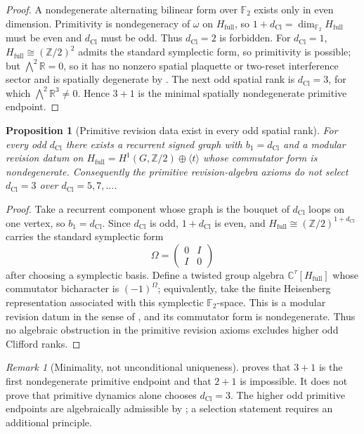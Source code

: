 \documentclass[11pt]{article}
\newtheorem{proposition}[theorem]{Proposition}
\theoremstyle{definition}
\theoremstyle{remark}
\newtheorem{remark}[theorem]{Remark}
\newcommand{\Z}{\mathbb{Z}}
\newcommand{\R}{\mathbb{R}}
\newcommand{\C}{\mathbb{C}}
\newcommand{\F}{\mathbb{F}}
\newcommand{\Hf}{H_{\mathrm{full}}}
\newcommand{\dCl}{d_{\mathrm{Cl}}}
\begin{document}
\begin{proof}
A nondegenerate alternating bilinear form over \(\F_2\) exists only in even
dimension.  Primitivity is nondegeneracy of \(\omega\) on \(\Hf\), so
\(1+\dCl=\dim_{\F_2}\Hf\) must be even and \(\dCl\) must be odd.  Thus \(\dCl=2\) is
forbidden.  For \(\dCl=1\), \(\Hf\cong(\Z/2)^2\) admits the standard symplectic
form, so primitivity is possible; but \(\bigwedge^2\R=0\), so it has no nonzero spatial plaquette or
two-reset interference sector and is spatially degenerate by
.  The next odd spatial rank is \(\dCl=3\), for
which \(\bigwedge^2\R^3\neq0\).  Hence \(3+1\) is the minimal
spatially nondegenerate primitive endpoint.
\end{proof}

\begin{proposition}[Primitive revision data exist in every odd spatial rank]
\label{prop:primitive-all-odd}
For every odd \(\dCl\) there exists a recurrent signed graph with \(b_1=\dCl\)
and a modular revision datum on
\(\Hf=H^1(G,\Z/2)\oplus\langle t\rangle\) whose commutator form is
nondegenerate.  Consequently the primitive revision-algebra axioms do not select
\(\dCl=3\) over \(\dCl=5,7,\ldots\).
\end{proposition}

\begin{proof}
Take a recurrent component whose graph is the bouquet of \(\dCl\) loops on one
vertex, so \(b_1=\dCl\).  Since \(\dCl\) is odd, \(1+\dCl\) is even, and
\(\Hf\cong(\Z/2)^{1+\dCl}\) carries the standard symplectic form
\[
  \Omega=\begin{pmatrix}0&I\\ I&0\end{pmatrix}
\]
after choosing a symplectic basis.  Define a twisted group algebra
\(\C^\tau[\Hf]\) whose commutator bicharacter is \((-1)^{\Omega}\); equivalently,
take the finite Heisenberg representation associated with this symplectic
\(\F_2\)-space.  This is a modular revision datum in the sense of
, and its commutator form is nondegenerate.
Thus no algebraic obstruction in the primitive revision axioms excludes higher
odd Clifford ranks.
\end{proof}

\begin{remark}[Minimality, not unconditional uniqueness]
\label{rem:minimal-not-unique}
 proves that \(3+1\) is the first
nondegenerate primitive endpoint and that \(2+1\) is impossible.  It does not
prove that primitive dynamics alone chooses \(\dCl=3\).  The higher odd primitive
endpoints are algebraically admissible by ; a
selection statement requires an additional principle.
\end{remark}
\end{document}
